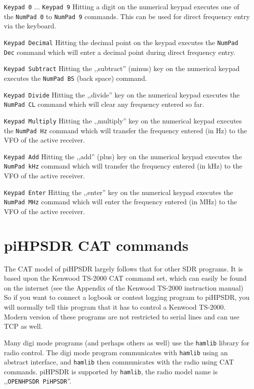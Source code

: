 \documentclass[12pt]{book}
\def\rett#1{\texttt{\color{red}#1}}
\def\bltt#1{\texttt{\color{blue}#1}}
\def\pH{pi\-HPSDR\xspace}
\begin{document}
\rett{Keypad 0} $\ldots$ \rett{Keypad 9} Hitting a digit on the numerical keypad executes one of the
\bltt{NumPad 0} to \bltt{NumPad 9} commands. This can be used for direct frequency entry
via the keyboard.

\rett{Keypad Decimal} Hitting the decimal point on the keypad executes the \bltt{NumPad Dec}
command which will enter a decimal point during direct frequency entry.

\rett{Keypad Subtract} Hitting the ,,subtract'' (minus) key on the numerical keypad executes the
\bltt{NumPad BS} (back space) command.

\rett{Keypad Divide} Hitting the ,,divide'' key on the numerical keypad executes the \bltt{NumPad CL}
command which will clear any frequency entered so far.

\rett{Keypad Multiply} Hitting the ,,multiply'' key on the numerical keypad executes the \bltt{NumPad Hz}
command which will transfer the frequency entered (in Hz) to the VFO of the active receiver.

\rett{Keypad Add} Hitting the ,,add'' (plus) key on the numerical keypad executes the \bltt{NumPad kHz}
command which will transfer the frequency entered (in kHz) to the VFO of the active receiver.

\rett{Keypad Enter} Hitting the ,,enter'' key on the numerical keypad executes the \bltt{NumPad MHz}
command which will enter the frequency entered (in MHz) to the VFO of the active receiver.


\chapter{\pH CAT commands}
\label{sec:catcommands}
The CAT model of \pH largely follows that for other SDR programs. It is based upon the Kenwood TS-2000
CAT command
set, which can easily be found on the internet (see the Appendix of the Kenwood TS-2000 instruction manual)
So if you want to connect a logbook
or contest logging program to \pH, you will normally tell this program that it has to control a Kenwood
TS-2000. Modern version of these programs are not restricted to serial lines and can use TCP as well.

Many digi mode programs (and perhaps others as well) use the \texttt{hamlib} library for radio control. The digi mode
program communicates with \texttt{hamlib} using an abstract interface, and \texttt{hamlib} then communicates with the radio
using CAT commands. \pH is supported by \texttt{hamlib}, the radio model name is ,,\texttt{OPENHPSDR PiHPSDR}''.
\end{document}
